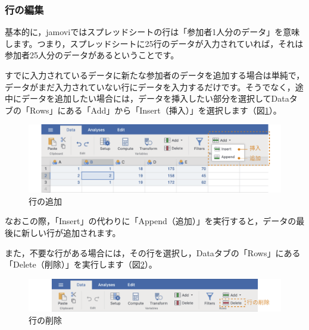 \documentclass[
  12pt,
  a5jpaper,
  lualatex, ja=standard]{bxjsbook}
\begin{document}
\hypertarget{ux884cux306eux7de8ux96c6}{%
\subsubsection*{行の編集}\label{ux884cux306eux7de8ux96c6}}

基本的に，jamoviではスプレッドシートの行は「参加者1人分のデータ」を意味します。つまり，スプレッドシートに25行のデータが入力されていれば，それは参加者25人分のデータがあるということです。

すでに入力されているデータに新たな参加者のデータを追加する場合は単純で，データがまだ入力されていない行にデータを入力するだけです。そうでなく，途中にデータを追加したい場合には，データを挿入したい部分を選択してDataタブの「Rows」にある「Add」から「Insert（挿入）」を選択します（図\ref{fig:add-row}）。

\begin{figure}[!ht]

{\centering \includegraphics[width=1\linewidth]{images/basics/add-row} 

}

\caption{行の追加}\label{fig:add-row}
\end{figure}

なおこの際，「Insert」の代わりに「Append（追加）」を実行すると，データの最後に新しい行が追加されます。

また，不要な行がある場合には，その行を選択し，Dataタブの「Rows」にある「Delete（削除）」を実行します（図\ref{fig:edit-row-delete}）。

\begin{figure}[!ht]

{\centering \includegraphics[width=1\linewidth]{images/basics/edit-row-delete} 

}

\caption{行の削除}\label{fig:edit-row-delete}
\end{figure}
\end{document}
